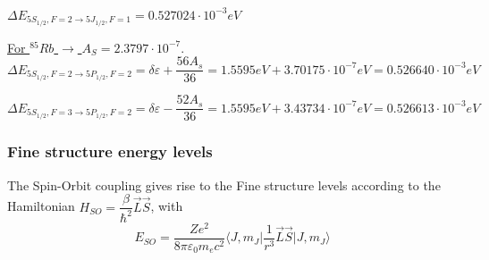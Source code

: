 \documentclass[openany,11pt,a4paper]{book}
\begin{document}
$\Delta E_{ 5S_{1/2}, F=2 \rightarrow 5J_{1/2}, F=1} = 0.527024 \cdot 10^{-3} eV$





\underline{For $^{85}Rb$ $\rightarrow$ $A_{S}= 2.3797 \cdot 10^{-7}$}.                \\

\begin{equation*}
\Delta E_{5S_{1/2},F=2 \rightarrow 5P_{1/2}, F=2} =  \delta\varepsilon + \dfrac{56 A_{s}}{36} = 1.5595 eV + 3.70175 \cdot 10^{-7} eV= 0.526640 \cdot 10^{-3} eV
\end{equation*}




\begin{equation*}
\Delta E_{5S_{1/2}, F=3 \rightarrow 5P_{1/2}, F=2} =\delta\varepsilon -\dfrac{52 A_{s}}{36}= 1.5595 eV + 3.43734 \cdot 10^{-7}eV = 0.526613 \cdot 10^{-3} eV
\end{equation*} 





\subsubsection{Fine structure energy levels}
The Spin-Orbit coupling gives rise to the Fine structure levels according to the Hamiltonian $H_{SO}= \dfrac{\beta}{\hbar^{2}} \vec{L} \vec{S}$, with
\begin{equation}
E_{SO}= \dfrac{Z e^{2}}{8\pi \varepsilon_{0} m_{e} c^{2}} \langle J, m_{J}\vert \dfrac{1}{r^{3}} \vec{L} \vec{S} \vert J, m_{J} \rangle
\end{equation}
\end{document}
